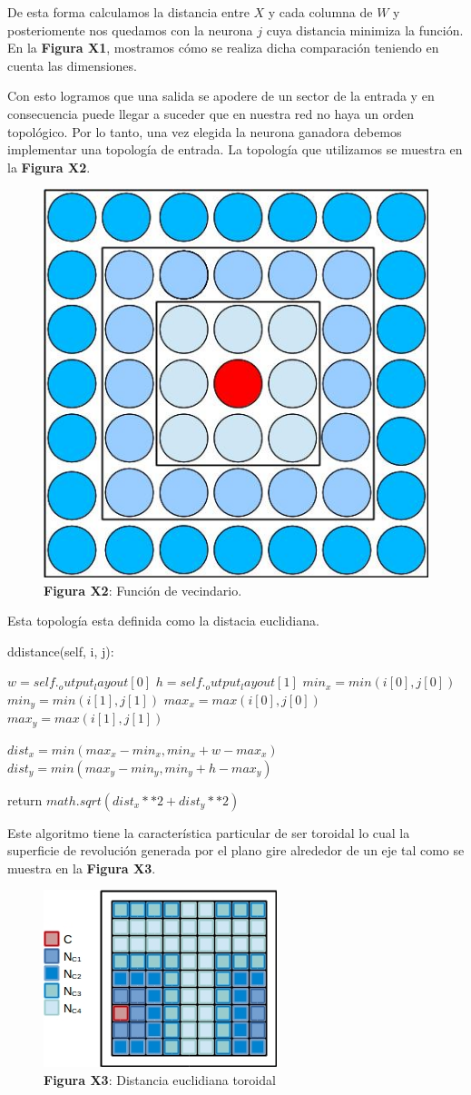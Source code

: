De esta forma calculamos la distancia entre $X$ y cada columna de $W$ y posteriomente nos quedamos con la neurona $j$ cuya distancia minimiza la función. En la \textbf{Figura X1}, mostramos cómo se realiza dicha comparación teniendo en cuenta las dimensiones.

Con esto logramos que una salida se apodere de un sector de la entrada y en consecuencia puede llegar a suceder que en nuestra red no haya un orden topológico. Por lo tanto, una vez elegida la neurona ganadora debemos implementar una topología de entrada. La topología que utilizamos se muestra en la \textbf{Figura X2}.

\begin{figure}[ht!]
	\centering
	\includegraphics[width=0.3\linewidth]{img/parte2-vecindario.jpg}
	\caption{\textbf{Figura X2}: Función de vecindario.}
\end{figure}

Esta topología esta definida como la distacia euclidiana. 

\begin{algorithm}
	\caption{ddistance(self, i, j):}
	\begin{algorithmic}
		\State $w = self._output_layout[0]$
		\State $h = self._output_layout[1]$
		\State $min_x = min(i[0], j[0])$
		\State $min_y = min(i[1], j[1])$
		\State $max_x = max(i[0], j[0])$
		\State $max_y = max(i[1], j[1])$

		\State $dist_x = min(max_x-min_x, min_x + w - max_x)$
		\State $dist_y = min(max_y - min_y, min_y + h - max_y)$

		\State return $math.sqrt(dist_x**2 + dist_y**2)$
	\end{algorithmic}
\end{algorithm}

Este algoritmo tiene la característica particular de ser toroidal lo cual la superficie de revolución generada por el plano gire alrededor de un eje tal como se muestra en la \textbf{Figura X3}.

\begin{figure}[ht!]
	\centering
	\includegraphics[width=0.5\linewidth]{img/parte2-toroidal.jpg}
	\caption{\textbf{Figura X3}: Distancia euclidiana toroidal}
\end{figure}

